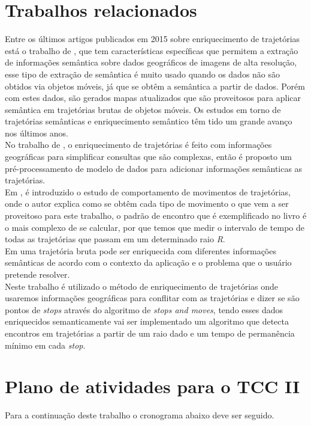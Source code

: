 \documentclass[	12pt, Times, openright, twoside, a4paper, english, brazil]{abntex2}
\begin{document}
\chapter{Trabalhos relacionados}
Entre os últimos artigos publicados em 2015 sobre enriquecimento de trajetórias está o trabalho de \cite{sublime2015}, que tem características específicas que permitem a extração de informações semântica sobre dados geográficos de imagens de alta resolução, esse tipo de extração de semântica é muito usado quando os dados não são obtidos via objetos móveis, já que se obtêm a semântica a partir de dados. Porém com estes dados, são gerados mapas atualizados que são proveitosos para aplicar semântica em trajetórias brutas de objetos móveis. Os estudos em torno de trajetórias semânticas e enriquecimento semântico têm tido um grande avanço nos últimos anos.\\
\indent No trabalho de \cite{alvares2007}, o enriquecimento de trajetórias é feito com informações geográficas para simplificar consultas que são complexas, então é proposto um pré-processamento de modelo de dados para adicionar informações semânticas as trajetórias.\\
\indent Em \cite{laube2005finding}, é introduzido o estudo de comportamento de movimentos de trajetórias, onde o autor explica como se obtêm cada tipo de movimento o que vem a ser proveitoso para este trabalho, o padrão de encontro que é exemplificado no livro é o mais complexo de se calcular, por que temos que medir o intervalo de tempo de todas as trajetórias que passam em um determinado raio \textit{R}.\\
\indent Em \cite{Bogorny2012} uma trajetória bruta pode ser enriquecida com diferentes informações semânticas de acordo com o contexto da aplicação e o problema que o usuário pretende resolver.\\
\indent Neste trabalho é utilizado o método de enriquecimento de trajetórias onde usaremos informações geográficas para conflitar com as trajetórias e dizer se são pontos de \textit{stops} através do algoritmo de \textit{stops and moves}, tendo esses dados enriquecidos semanticamente vai ser implementado um algoritmo que detecta encontros em trajetórias a partir de um raio dado e um tempo de permanência mínimo em cada \textit{stop}.

\chapter{Plano de atividades para o TCC II}
Para a continuação deste trabalho o cronograma abaixo deve ser seguido.
\end{document}
